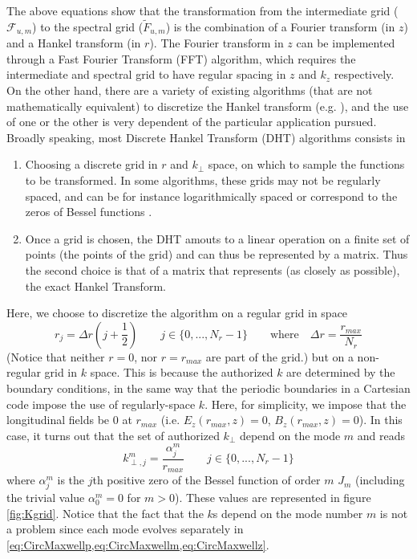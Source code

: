 \documentclass[a4paper]{article}   	%
\begin{document}
The above equations show that the transformation from the intermediate
grid ($\mathcal{F}_{u,m}$) to the spectral grid ($\tilde{F}_{u,m}$) is
the combination of a Fourier transform (in $z$) and a Hankel transform
(in $r$). The Fourier transform in $z$ can be implemented through a Fast Fourier
Transform (FFT) algorithm, which requires the intermediate and spectral grid to
have regular spacing in $z$ and $k_z$ respectively. On the other hand,
there are a variety of existing algorithms (that are not mathematically
equivalent) to discretize the Hankel
transform (e.g. \cite{Cree,Yu,Siegman,Guizar,KaiMing}), and the use of one or the other
is very dependent of the particular application pursued. Broadly
speaking, most Discrete Hankel Transform (DHT) algorithms consists in 
\begin{enumerate}
\item Choosing a discrete grid in $r$ and $k_\perp$ space, on which to
  sample the functions to be transformed. In some algorithms, these
  grids may not be regularly spaced, and can be for instance
  logarithmically spaced \cite{Siegman} or correspond to the zeros of
  Bessel functions \cite{Yu,Guizar,KaiMing}.
\item Once a grid is chosen, the DHT amouts to a linear operation on a
  finite set of points (the points of the grid) and can thus be
  represented by a matrix. Thus the second choice is that of a matrix
  that represents (as closely as possible), the exact Hankel Transform.
\end{enumerate}
Here, we choose to discretize the algorithm on a regular grid in
space
\[ r_j = \Delta r \left( j+\frac{1}{2} \right) \qquad  j \in \{0, ...,
N_r-1 \} \qquad \mathrm{where} \quad \Delta r = \frac{r_{max}}{N_r} \]
(Notice that neither $r=0$, nor $r=r_{max}$ are part of the grid.)
but on a non-regular grid in $k$ space. This is because the authorized
$k$ are determined by the boundary conditions, in the same way that
the periodic boundaries in a Cartesian code impose the use of
regularly-space $k$. Here, for simplicity, we impose that the
longitudinal fields be $0$ at $r_{max}$ (i.e. $E_z(r_{max}, z) = 0$,
$B_z(r_{max}, z) = 0$). In this case, it turns out that the set of authorized
$k_\perp$ depend on the mode $m$ and reads
\[  k^m_{\perp,j} = \frac{\alpha_j^m}{r_{max}} \qquad j \in \{0, ..., N_r-1 \}\]
where $\alpha^m_j$ is the $j$th positive zero of the Bessel function of order
$m$ $J_m$ (including the trivial value $\alpha_0^m=0$ for
$m>0$). These values are represented in figure \ref{fig:Kgrid}. Notice
that the fact that the $k$s depend on the mode number $m$ is not a
problem since each mode evolves separately in
\cref{eq:CircMaxwellp,eq:CircMaxwellm,eq:CircMaxwellz}.
\end{document}
